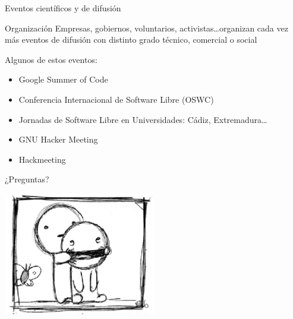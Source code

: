 \documentclass{beamer}
\begin{document}
\begin{frame}{Eventos científicos y de difusión}
  \begin{block}{Organización}
    Empresas, gobiernos, voluntarios, activistas\ldots organizan cada vez más eventos de difusión con distinto grado técnico, comercial o social
  \end{block}
  Algunos de estos eventos:
  \begin{itemize}[<+->]
    \item Google Summer of Code
  	\item Conferencia Internacional de Software Libre (OSWC)
  	\item Jornadas de Software Libre en Universidades: Cádiz, Extremadura\ldots
  	\item GNU Hacker Meeting
  	\item Hackmeeting
  \end{itemize}
\end{frame}


\begin{frame}
  \begin{center}
    \huge
    \alert{¿Preguntas?}\\
  \end{center}
  \begin{center}
    \includegraphics[width=0.5\textwidth]{pics/sonrisa.png}
  \end{center}
\end{frame}
\end{document}
